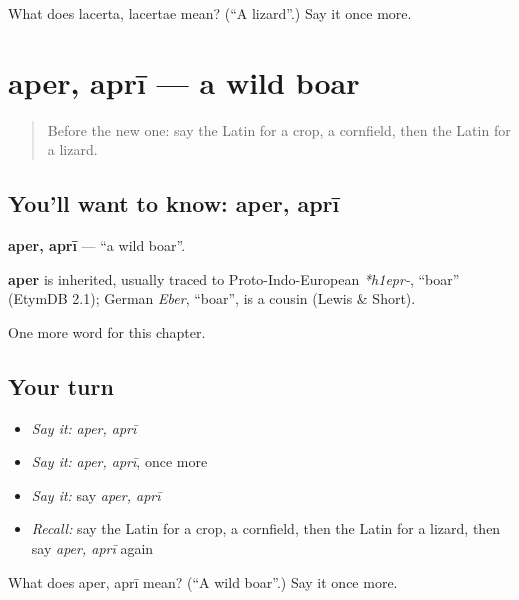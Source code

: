 \begin{tcolorbox}[breakable,colback=teal!4,colframe=teal!35!black,title={Before you move on}]
What does lacerta, lacertae mean? (\textquotedblleft{}A lizard\textquotedblright{}.) Say it once more.
\end{tcolorbox}
\section[aper, aprī]{aper, aprī — a wild boar}

\label{lesson:LA-C224-aper}



\begin{quote}
Before the new one: say the Latin for a crop, a cornfield, then the Latin for a lizard.
\end{quote}

\subsection*{You'll want to know: aper, aprī}
\textbf{aper, aprī} — \textquotedblleft{}a wild boar\textquotedblright{}.

\begin{cousinweb}
\textbf{aper} is inherited, usually traced to Proto-Indo-European \emph{*h1epr-}, \textquotedblleft{}boar\textquotedblright{} (EtymDB 2.1); German \emph{Eber}, \textquotedblleft{}boar\textquotedblright{}, is a cousin (Lewis \& Short).
\end{cousinweb}

\begin{grammarlens}[title={What you've built}]
One more word for this chapter.
\end{grammarlens}

\subsection*{Your turn}
\begin{itemize}
\raggedright
  \item \emph{Say it:} \emph{aper, aprī}
  \item \emph{Say it:} \emph{aper, aprī}, once more
  \item \emph{Say it:} say \emph{aper, aprī}
  \item \emph{Recall:} say the Latin for a crop, a cornfield, then the Latin for a lizard, then say \emph{aper, aprī} again
\end{itemize}

\begin{tcolorbox}[breakable,colback=teal!4,colframe=teal!35!black,title={Before you move on}]
What does aper, aprī mean? (\textquotedblleft{}A wild boar\textquotedblright{}.) Say it once more.
\end{tcolorbox}
